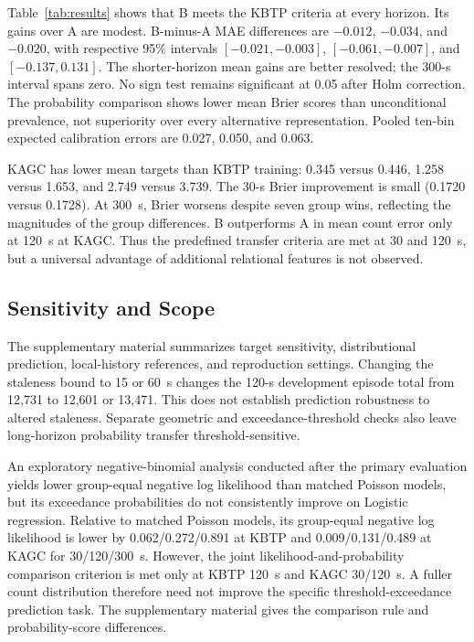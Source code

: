 \documentclass[10pt,journal,letterpaper]{IEEEtran}
\begin{document}
Table~\ref{tab:results} shows that B meets the KBTP criteria at every horizon. Its gains over A are modest. B-minus-A MAE differences are $-0.012$, $-0.034$, and $-0.020$, with respective 95\% intervals $[-0.021,-0.003]$, $[-0.061,-0.007]$, and $[-0.137,0.131]$. The shorter-horizon mean gains are better resolved; the 300-s interval spans zero. No sign test remains significant at 0.05 after Holm correction. The probability comparison shows lower mean Brier scores than unconditional prevalence, not superiority over every alternative representation. Pooled ten-bin expected calibration errors are 0.027, 0.050, and 0.063.

KAGC has lower mean targets than KBTP training: 0.345 versus 0.446, 1.258 versus 1.653, and 2.749 versus 3.739. The 30-s Brier improvement is small (0.1720 versus 0.1728). At 300~s, Brier worsens despite seven group wins, reflecting the magnitudes of the group differences. B outperforms A in mean count error only at 120~s at KAGC. Thus the predefined transfer criteria are met at 30 and 120~s, but a universal advantage of additional relational features is not observed.

\subsection{Sensitivity and Scope}
The supplementary material summarizes target sensitivity, distributional prediction, local-history references, and reproduction settings. Changing the staleness bound to 15 or 60~s changes the 120-s development episode total from 12,731 to 12,601 or 13,471. This does not establish prediction robustness to altered staleness. Separate geometric and exceedance-threshold checks also leave long-horizon probability transfer threshold-sensitive.

An exploratory negative-binomial analysis conducted after the primary evaluation yields lower group-equal negative log likelihood than matched Poisson models, but its exceedance probabilities do not consistently improve on Logistic regression. Relative to matched Poisson models, its group-equal negative log likelihood is lower by 0.062/0.272/0.891 at KBTP and 0.009/0.131/0.489 at KAGC for 30/120/300~s. However, the joint likelihood-and-probability comparison criterion is met only at KBTP 120~s and KAGC 30/120~s. A fuller count distribution therefore need not improve the specific threshold-exceedance prediction task. The supplementary material gives the comparison rule and probability-score differences.
\end{document}
